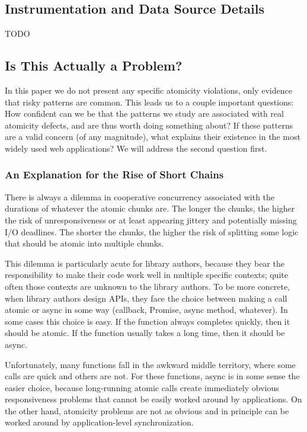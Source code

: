 \documentclass[acmsmall,anonymous,review]{acmart}\settopmatter{printfolios=true,printccs=false,printacmref=false}
\begin{document}
\subsection{Instrumentation and Data Source Details}

TODO

\subsection{Is This Actually a Problem?}

In this paper we do not present any specific atomicity violations, only evidence that risky patterns are common.
This leads us to a couple important questions:
How confident can we be that the patterns we study are associated with real atomicity defects, and are thus worth doing something about?
If these patterns are a valid concern (of any magnitude), what explains their existence in the most widely used web applications?
We will address the second question first.

\subsubsection{An Explanation for the Rise of Short Chains}

There is always a dilemma in cooperative concurrency associated with the durations of whatever the atomic chunks are.
The longer the chunks, the higher the risk of unresponsiveness or at least appearing jittery and potentially missing I/O deadlines.
The shorter the chunks, the higher the risk of splitting some logic that should be atomic into multiple chunks.

This dilemma is particularly acute for library authors, because they bear the responsibility to make their code work well in multiple specific contexts; quite often those contexts are unknown to the library authors.
To be more concrete, when library authors design APIs, they face the choice between making a call atomic or async in some way (callback, Promise, async method, whatever).
In some cases this choice is easy.
If the function always completes quickly, then it should be atomic.
If the function usually takes a long time, then it should be async.

Unfortunately, many functions fall in the awkward middle territory, where some calls are quick and others are not.
For these functions, async is in some sense the easier choice, because long-running atomic calls create immediately obvious responsiveness problems that cannot be easily worked around by applications.
On the other hand, atomicity problems are not as obvious and in principle can be worked around by application-level synchronization.
\end{document}
